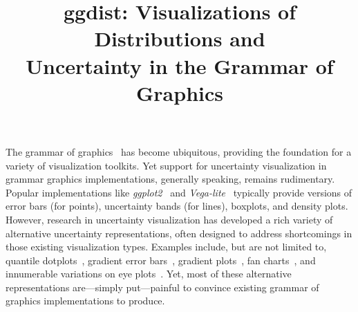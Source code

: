 \documentclass[journal]{vgtc}                     %
\title{ggdist: Visualizations of Distributions and\\Uncertainty in the Grammar of Graphics}
\author{%
  \authororcid{Matthew Kay}{0000-0001-9446-0419}
}
\begin{document}


\maketitle



The grammar of graphics~\cite{wilkinson2012grammar} has become ubiquitous, providing the foundation for a variety of visualization toolkits. Yet support for uncertainty visualization in grammar graphics implementations, generally speaking, remains rudimentary. Popular implementations like \textit{ggplot2}~\cite{wickham2010layered,wickham2011ggplot2} and \textit{Vega-lite}~\cite{satyanarayan2016vega} typically provide versions of error bars (for points), uncertainty bands (for lines), boxplots, and density plots. However, research in uncertainty visualization has developed a rich variety of alternative uncertainty representations, often designed to address shortcomings in those existing visualization types. Examples include, but are not limited to, quantile dotplots~\cite{kay2016ish,fernandes2018uncertainty}, gradient error bars~\cite{correll2014error}, gradient plots~\cite{bowman2019graphics,jackson2008displaying}, fan charts~\cite{jackson2008displaying}, and innumerable variations on eye plots~\cite{helske2021can,kay2016ish,barrowman2003raindrop,spiegelhalter1999surgical}. Yet, most of these alternative representations are---simply put---painful to convince existing grammar of graphics implementations to produce.
\end{document}
